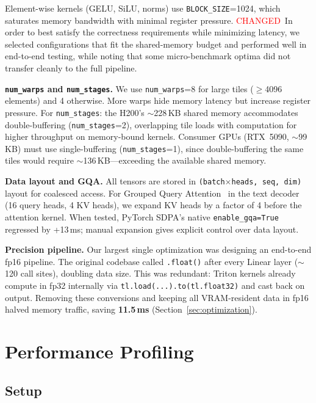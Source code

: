 \documentclass{article}
\newcommand{\chg}[1]{{\color{blue}#1}}
\newcommand{\chglabel}{{\setlength{\fboxsep}{1pt}\colorbox{yellow!45}{\textcolor{red}{\scriptsize CHANGED}}}}
\begin{document}
Element-wise kernels (GELU, SiLU, norms) use \texttt{BLOCK\_SIZE}=1024, which saturates memory bandwidth with minimal register pressure.
\chglabel\ \chg{In order to best satisfy the correctness requirements while minimizing latency, we selected configurations that fit the shared-memory budget and performed well in end-to-end testing, while noting that some micro-benchmark optima did not transfer cleanly to the full pipeline.}

\textbf{\texttt{num\_warps} and \texttt{num\_stages}.}
We use \texttt{num\_warps}=8 for large tiles ($\geq$4096 elements) and 4 otherwise.  More warps hide memory latency but increase register pressure.
For \texttt{num\_stages}: the H200's $\sim$228\,KB shared memory accommodates double-buffering (\texttt{num\_stages}=2), overlapping tile loads with computation for higher throughput on memory-bound kernels.  Consumer GPUs (RTX~5090, $\sim$99\,KB) must use single-buffering (\texttt{num\_stages}=1), since double-buffering the same tiles would require $\sim$136\,KB---exceeding the available shared memory.

\textbf{Data layout and GQA.}
All tensors are stored in \texttt{(batch$\times$heads, seq, dim)} layout for coalesced access.  For Grouped Query Attention~\citep{ainslie2023gqa} in the text decoder (16 query heads, 4 KV heads), we expand KV heads by a factor of 4 before the attention kernel.  When tested, PyTorch SDPA's native \texttt{enable\_gqa=True} regressed by +13\,ms; manual expansion gives explicit control over data layout.

\textbf{Precision pipeline.}
Our largest single optimization was designing an end-to-end fp16 pipeline.
The original codebase called \texttt{.float()} after every Linear layer ($\sim$120 call sites), doubling data size.  This was redundant: Triton kernels already compute in fp32 internally via \texttt{tl.load(...).to(tl.float32)} and cast back on output.
Removing these conversions and keeping all VRAM-resident data in fp16 halved memory traffic, saving \textbf{11.5\,ms} (Section~\ref{sec:optimization}).

\section{Performance Profiling}\label{sec:profiling}

\subsection{Setup}
\end{document}
